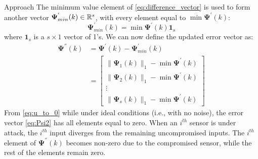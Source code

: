 \begin{section}{Approach}
The minimum value element of \eqref{eq:difference_vector} is used to form another vector $\bm{\Psi}^{'}_{min}(k) \in \mathbb{R}^s$, with every element equal to $\min \bm{\Psi}^{'}(k)$:
    \begin{equation}
	\bm{\Psi}^{'}_{min}(k)=\min \bm{\Psi}^{'}(k){\bm{1}}_s
	\end{equation}
where ${\bm{1}}_s$ is a $s\times1$ vector of 1's. We can now define the updated error vector as:
    \begin{equation}
    \begin{split}
    \label{eq:Psi2}
	\bm{\Psi}^{''}(k)&=\bm{\Psi}^{'}(k)-\bm{\Psi}^{'}_{min}(k) \\
	&=\begin{bmatrix} \lVert{\bm{\Psi}_1(k)}\rVert_1 - \min \bm{\Psi}^{'}(k)\\ \lVert{\bm{\Psi}_2(k)}\rVert_1 - \min \bm{\Psi}^{'}(k)\\ \vdots \\ \lVert{\bm{\Psi}_s(k)}\rVert_1 - \min \bm{\Psi}^{'}(k) \end{bmatrix}
	\end{split}
	\end{equation}
From \eqref{eq:u_to_0} while under ideal conditions (i.e., with no noise), the error vector \eqref{eq:Psi2} has all elements equal to zero. When an $i^{th}$ sensor is under attack, the $i^{th}$ input diverges from the remaining uncompromised inputs. The $i^{th}$ element of $\bm{\Psi}^{''}(k)$ becomes non-zero due to the compromised sensor, while the rest of the elements remain zero. 


\end{section}
